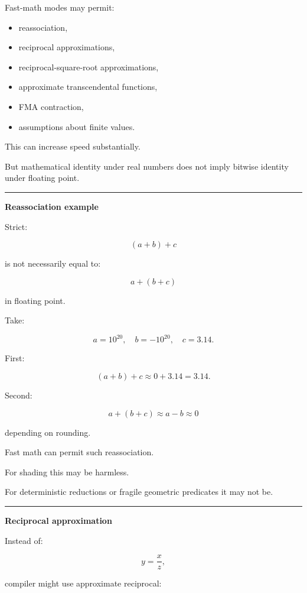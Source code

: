 Fast-math modes may permit:

\begin{itemize}
\tightlist
\item
  reassociation,
\item
  reciprocal approximations,
\item
  reciprocal-square-root approximations,
\item
  approximate transcendental functions,
\item
  FMA contraction,
\item
  assumptions about finite values.
\end{itemize}

This can increase speed substantially.

But mathematical identity under real numbers does not imply bitwise identity under floating point.

\begin{center}\rule{0.5\linewidth}{0.5pt}\end{center}

\textbf{Reassociation example}

Strict:

\[
(a+b)+c
\]

is not necessarily equal to:

\[
a+(b+c)
\]

in floating point.

Take:

\[
a=10^{20},
\quad
b=-10^{20},
\quad
c=3.14.
\]

First:

\[
(a+b)+c
\approx
0+3.14
=
3.14.
\]

Second:

\[
a+(b+c)
\approx
a-b
\approx0
\]

depending on rounding.

Fast math can permit such reassociation.

For shading this may be harmless.

For deterministic reductions or fragile geometric predicates it may not be.

\begin{center}\rule{0.5\linewidth}{0.5pt}\end{center}

\textbf{Reciprocal approximation}

Instead of:

\[
y=\frac{x}{z},
\]

compiler might use approximate reciprocal:

